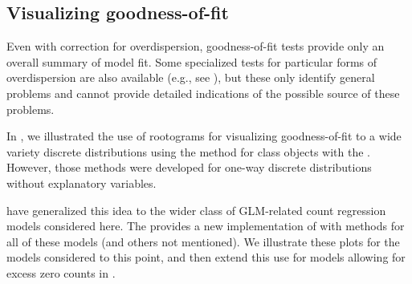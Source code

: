 \documentclass[11pt]{book}\usepackage[]{graphicx}\usepackage[]{color}
\begin{document}
\subsection{Visualizing goodness-of-fit}\label{sec:glm-visfit}

Even with correction for overdispersion, goodness-of-fit tests provide only an overall
summary of model fit.  Some specialized tests for particular forms of overdispersion
are also available (e.g., see \citet[]{CameronTrivedi:1998}),
but these only identify general problems and cannot provide detailed indications of
the possible source of these problems.

In , we illustrated the use of rootograms for visualizing goodness-of-fit
to a wide variety discrete distributions using the  method for
class  objects with the .  However, those methods were
developed for one-way discrete distributions without explanatory variables.

\citet{KleiberZeileis:2014} have generalized this idea to the wider class of 
GLM-related count regression models considered here.
The  provides a new implementation of 
with methods for all of these models (and others not mentioned).
We illustrate these plots for the models considered to this point, and then extend
this use for models allowing for excess zero counts in .
\end{document}

